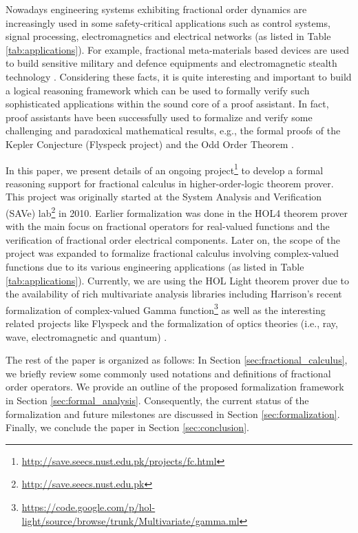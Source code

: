 \documentclass {llncs}
\begin{document}
Nowadays engineering  systems exhibiting fractional order dynamics
are  increasingly used in some safety-critical applications such as
control systems, signal processing, electromagnetics and electrical networks (as listed in Table \ref{tab:applications}).
For example, fractional meta-materials based devices are used to
build sensitive military and defence equipments and electromagnetic stealth technology \cite{Matameterial}.
Considering these facts, it is quite  interesting and important to build a logical reasoning framework
which can be used to formally verify such sophisticated applications within the sound core
of a proof assistant. In fact, proof assistants have been  successfully
used to formalize and verify some  challenging and paradoxical mathematical results, e.g.,
the formal proofs of the Kepler Conjecture
(Flyspeck project) \cite{flyspeck}
and  the Odd Order Theorem \cite{ODD_ORDER}.


In this paper, we present details of an ongoing project\footnote{\url{http://save.seecs.nust.edu.pk/projects/fc.html}}  to develop a formal reasoning support for fractional calculus in higher-order-logic theorem prover. This project was originally started at the System Analysis and Verification
(SAVe) lab\footnote{\url{http://save.seecs.nust.edu.pk}} in 2010. Earlier formalization was done in the HOL4 theorem prover
with the main focus on  fractional operators for real-valued functions and the verification of
 fractional order electrical components. Later on, the scope of the project was expanded to
formalize fractional calculus involving complex-valued functions due to its various engineering applications (as listed in Table \ref{tab:applications}). Currently, we are using the
  HOL Light theorem prover due to the availability of rich multivariate analysis libraries
 including Harrison's recent formalization of complex-valued
 Gamma function\footnote{{\url{https://code.google.com/p/hol-light/source/browse/trunk/Multivariate/gamma.ml}}}
 as well as the interesting related projects like Flyspeck \cite{flyspeck} and  the formalization of  optics
 theories (i.e., ray, wave, electromagnetic and quantum) \cite{do-form-journal}.

The rest of the paper is organized as follows: In Section \ref{sec:fractional_calculus}, we briefly
review some commonly used notations and definitions of fractional order operators. We provide an outline of
the proposed formalization framework in Section \ref{sec:formal_analysis}. Consequently, the current status of the formalization
and future milestones are discussed in Section \ref{sec:formalization}. Finally, we conclude the paper in
Section \ref{sec:conclusion}.
\end{document}
